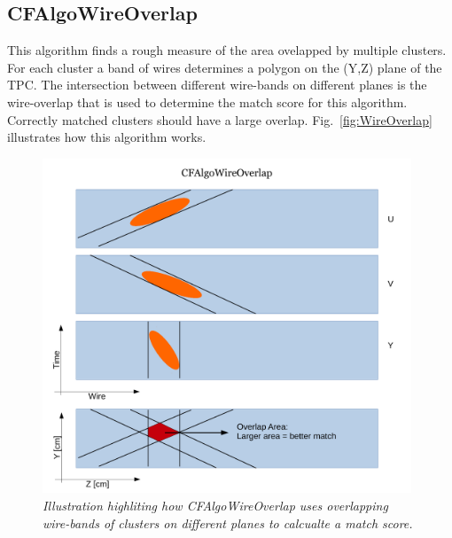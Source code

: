 \documentclass{article}
\begin{document}
\subsection{CFAlgoWireOverlap}
This algorithm finds a rough measure of the area ovelapped by multiple clusters. For each cluster a band of wires determines a polygon on the (Y,Z) plane 
of the TPC. The intersection between different wire-bands on different planes is the wire-overlap that is used to determine the match score for this 
algorithm. Correctly matched clusters should have a large overlap.
Fig.~\ref{fig:WireOverlap} illustrates how this algorithm works.
\begin{figure}[!h]
\begin{center}
\includegraphics[width=110mm]{Figures/MatchAglo_CFAlgoWireOverlap_Description.pdf}
\end{center}
\caption{\textit{Illustration highliting how CFAlgoWireOverlap uses overlapping wire-bands of clusters on different planes to calcualte a match score.}}
\label{fig:VolumeOverlap}
\end{figure}

\newpage
\end{document}
